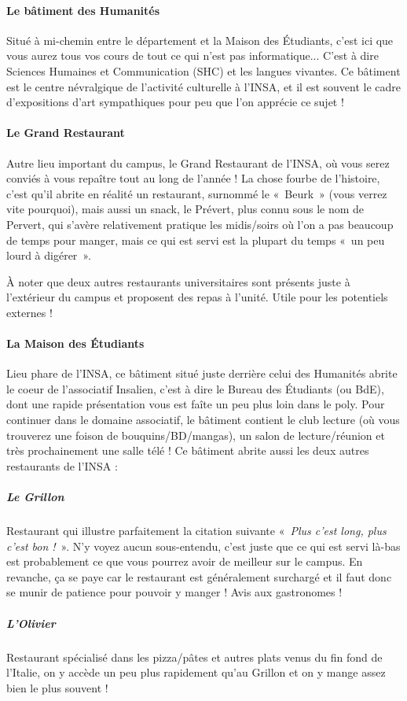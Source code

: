 \paragraph{Le bâtiment des Humanités}
Situé à mi-chemin entre le département et la Maison des Étudiants, c'est ici
que vous aurez tous vos cours de tout ce qui n'est pas informatique... C'est à
dire Sciences Humaines et Communication (SHC) et les langues vivantes. 
Ce bâtiment est le centre névralgique de l'activité culturelle à l'INSA, et il
est souvent le cadre d'expositions d'art sympathiques pour peu que l'on apprécie ce sujet !

\paragraph{Le Grand Restaurant}
Autre lieu important du campus, le Grand Restaurant de l'INSA, où vous
serez conviés à vous repaître tout au long de l'année ! La chose fourbe de l'histoire, c'est qu'il abrite en réalité un restaurant, surnommé le «~Beurk~» (vous verrez vite pourquoi), mais aussi
un snack, le Prévert, plus connu sous le nom de Pervert, qui s'avère
relativement pratique les midis/soirs où l'on a pas beaucoup de temps pour manger, mais ce
qui est servi est la plupart du temps «~un peu lourd à digérer~».

\vspace{1em}

À noter que deux autres restaurants universitaires sont présents juste à l'extérieur du campus et proposent des repas à l'unité. Utile pour les potentiels externes !

\paragraph{La Maison des Étudiants}
Lieu phare de l'INSA, ce bâtiment situé juste derrière celui des Humanités
abrite le coeur de l'associatif Insalien, c'est à dire le Bureau des Étudiants (ou
BdE), dont une rapide présentation vous est faîte un peu plus loin dans le
poly. Pour continuer dans le domaine associatif, le bâtiment contient le
club lecture (où vous trouverez une foison de bouquins/BD/mangas), un salon de
lecture/réunion et très prochainement une salle télé !
Ce bâtiment abrite aussi les deux autres restaurants de l'INSA :
\subparagraph{Le Grillon}
Restaurant qui illustre parfaitement la citation suivante «~\emph{Plus c'est long,
	   plus c'est bon !}~». N'y voyez aucun sous-entendu, c'est juste que ce qui est servi là-bas est probablement
ce que vous pourrez avoir de meilleur sur le campus. En revanche, ça se paye car le restaurant 
est généralement surchargé et il faut donc se munir de patience pour pouvoir y manger ! Avis aux gastronomes ! 
\subparagraph{L'Olivier}
Restaurant  spécialisé dans les pizza/pâtes et autres plats venus du fin
fond de l'Italie, on y accède un peu plus rapidement qu'au Grillon et on y
mange assez bien le plus souvent !

